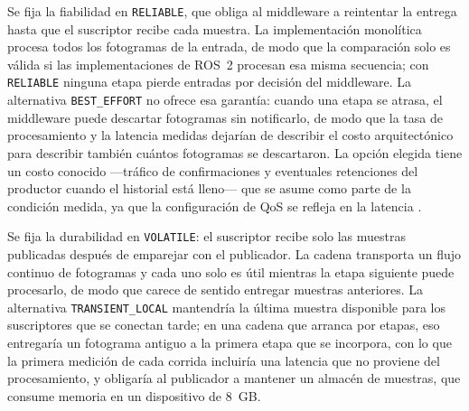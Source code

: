 Se fija la fiabilidad en \texttt{RELIABLE}, que obliga al middleware a
reintentar la entrega hasta que el suscriptor recibe cada muestra. La
implementación monolítica procesa todos los fotogramas de la entrada, de modo
que la comparación solo es válida si las implementaciones de ROS~2 procesan
esa misma secuencia; con \texttt{RELIABLE} ninguna etapa pierde entradas por
decisión del middleware. La alternativa \texttt{BEST\_EFFORT} no ofrece esa
garantía: cuando una etapa se atrasa, el middleware puede descartar
fotogramas sin notificarlo, de modo que la tasa de procesamiento y la latencia
medidas dejarían de describir el costo arquitectónico para describir también
cuántos fotogramas se descartaron. La opción elegida tiene un costo conocido
—tráfico de confirmaciones y eventuales retenciones del productor cuando el
historial está lleno— que se asume como parte de la condición medida, ya que
la configuración de QoS se refleja en la latencia \cite{fernandez2020,
kronauer2021}.

Se fija la durabilidad en \texttt{VOLATILE}: el suscriptor recibe solo las
muestras publicadas después de emparejar con el publicador. La cadena
transporta un flujo continuo de fotogramas y cada uno solo es útil mientras la
etapa siguiente puede procesarlo, de modo que carece de sentido entregar
muestras anteriores. La alternativa \texttt{TRANSIENT\_LOCAL} mantendría la
última muestra disponible para los suscriptores que se conectan tarde; en una
cadena que arranca por etapas, eso entregaría un fotograma antiguo a la
primera etapa que se incorpora, con lo que la primera medición de cada corrida
incluiría una latencia que no proviene del procesamiento, y obligaría al
publicador a mantener un almacén de muestras, que consume memoria en un
dispositivo de 8~GB.


